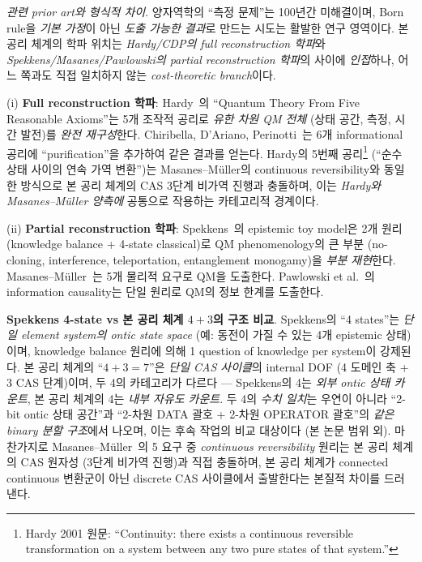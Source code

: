 \documentclass[entropy,article,submit,pdftex,oneauthor]{Definitions/mdpi}
\begin{document}
\emph{관련 prior art와 형식적 차이}. 양자역학의 ``측정 문제''는 100년간 미해결이며, Born rule을 \emph{기본 가정}이 아닌 \emph{도출 가능한 결과}로 만드는 시도는 활발한 연구 영역이다. 본 공리 체계의 학파 위치는 \emph{Hardy/CDP의 full reconstruction 학파}와 \emph{Spekkens/Masanes/Pawlowski의 partial reconstruction 학파}의 사이에 \emph{인접}하나, 어느 쪽과도 직접 일치하지 않는 \emph{cost-theoretic branch}이다.

(i) \textbf{Full reconstruction 학파}: Hardy~\cite{hardy2001}의 ``Quantum Theory From Five Reasonable Axioms''는 5개 조작적 공리로 \emph{유한 차원 QM 전체} (상태 공간, 측정, 시간 발전)를 \emph{완전 재구성}한다. Chiribella, D'Ariano, Perinotti~\cite{cdp2011}는 6개 informational 공리에 ``purification''을 추가하여 같은 결과를 얻는다. Hardy의 5번째 공리\footnote{Hardy 2001 원문: ``Continuity: there exists a continuous reversible transformation on a system between any two pure states of that system.''} (``순수 상태 사이의 연속 가역 변환'')는 Masanes--M\"uller의 continuous reversibility와 동일한 방식으로 본 공리 체계의 CAS 3단계 비가역 진행과 충돌하며, 이는 \emph{Hardy와 Masanes--M\"uller 양측에} 공통으로 작용하는 카테고리적 경계이다.

(ii) \textbf{Partial reconstruction 학파}: Spekkens~\cite{spekkens2007}의 epistemic toy model은 2개 원리 (knowledge balance + 4-state classical)로 QM phenomenology의 큰 부분 (no-cloning, interference, teleportation, entanglement monogamy)을 \emph{부분 재현}한다. Masanes--M\"uller~\cite{masanes2011}는 5개 물리적 요구로 QM을 도출한다. Pawlowski et al.~\cite{pawlowski2009}의 information causality는 단일 원리로 QM의 정보 한계를 도출한다.

\textbf{Spekkens 4-state vs 본 공리 체계 $4+3$의 구조 비교}. Spekkens의 ``4 states''는 \emph{단일 element system의 ontic state space} (예: 동전이 가질 수 있는 4개 epistemic 상태)이며, knowledge balance 원리에 의해 1 question of knowledge per system이 강제된다. 본 공리 체계의 ``$4+3 = 7$''은 \emph{단일 CAS 사이클}의 internal DOF (4 도메인 축 + 3 CAS 단계)이며, 두 4의 카테고리가 다르다 — Spekkens의 4는 \emph{외부 ontic 상태 카운트}, 본 공리 체계의 4는 \emph{내부 자유도 카운트}. 두 4의 \emph{수치 일치}는 우연이 아니라 ``2-bit ontic 상태 공간''과 ``2-차원 DATA 괄호 + 2-차원 OPERATOR 괄호''의 \emph{같은 binary 분할 구조}에서 나오며, 이는 후속 작업의 비교 대상이다 (본 논문 범위 외). 마찬가지로 Masanes--M\"uller~\cite{masanes2011}의 5 요구 중 \emph{continuous reversibility} 원리는 본 공리 체계의 CAS 원자성 (3단계 비가역 진행)과 직접 충돌하며, 본 공리 체계가 connected continuous 변환군이 아닌 discrete CAS 사이클에서 출발한다는 본질적 차이를 드러낸다.
\end{document}
